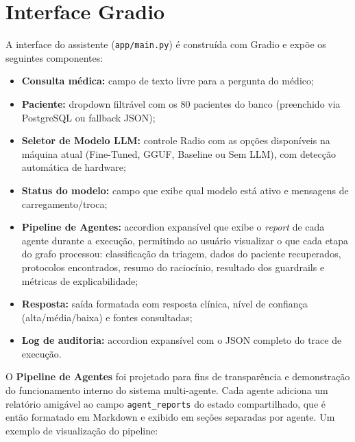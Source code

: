 \section{Interface Gradio}\label{sec:interface}

A interface do assistente (\texttt{app/main.py}) é construída com Gradio e expõe os seguintes componentes:

\begin{itemize}
    \item \textbf{Consulta médica:} campo de texto livre para a pergunta do médico;
    \item \textbf{Paciente:} dropdown filtrável com os 80 pacientes do banco (preenchido via PostgreSQL ou fallback JSON);
    \item \textbf{Seletor de Modelo LLM:} controle Radio com as opções disponíveis na máquina atual (Fine-Tuned, GGUF, Baseline ou Sem LLM), com detecção automática de hardware;
    \item \textbf{Status do modelo:} campo que exibe qual modelo está ativo e mensagens de carregamento/troca;
    \item \textbf{Pipeline de Agentes:} accordion expansível que exibe o \textit{report} de cada agente durante a execução, permitindo ao usuário visualizar o que cada etapa do grafo processou: classificação da triagem, dados do paciente recuperados, protocolos encontrados, resumo do raciocínio, resultado dos guardrails e métricas de explicabilidade;
    \item \textbf{Resposta:} saída formatada com resposta clínica, nível de confiança (alta/média/baixa) e fontes consultadas;
    \item \textbf{Log de auditoria:} accordion expansível com o JSON completo do trace de execução.
\end{itemize}

O \textbf{Pipeline de Agentes} foi projetado para fins de transparência e demonstração do funcionamento interno do sistema multi-agente. Cada agente adiciona um relatório amigável ao campo \texttt{agent\_reports} do estado compartilhado, que é então formatado em Markdown e exibido em seções separadas por agente. Um exemplo de visualização do pipeline:

